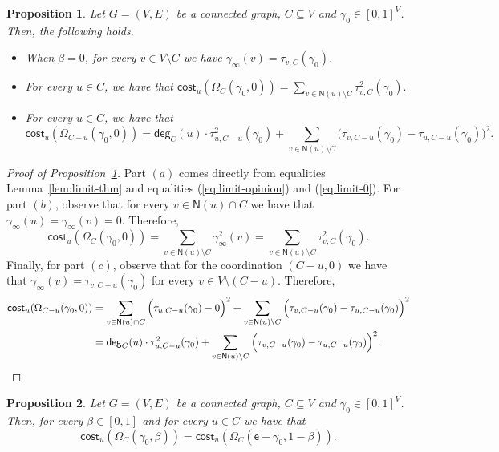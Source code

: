 \documentclass[letterpaper,11pt]{article}
\newcommand{\nsf}{\mathsf{N}}
\newcommand{\cost}{\mathsf{cost}}
\newcommand{\degsf}{\mathsf{deg}}
\newtheorem{proposition}{Proposition}
\begin{document}
\begin{proposition}
\label{prop:properties}
Let $G=(V,E)$ be a connected graph, $C\subseteq V$ and $\gamma_0\in [0,1]^V$.
Then, the following holds.
\begin{itemize}
	\item[$(a)$] When $\beta=0$, for every $v\in V\setminus C$ we have $\gamma_{\infty}(v)=\tau_{v,C}(\gamma_0)$.
	\item[$(b)$]  For every $u\in C$, we have that 
 $\displaystyle \cost_u(\Omega_C(\gamma_0,0))=\sum_{v\in \nsf(u)\setminus C}\tau^2_{v,C}(\gamma_0).$
	\item[$(c)$]  For every $u\in C$, we have that
\begin{equation*}
\cost_u(\Omega_{C-u}(\gamma_0,0))=\degsf_C(u)\cdot \tau^2_{u,C-u}(\gamma_0)+\sum_{v\in \nsf(u)\setminus C}\Big(\tau_{v,C-u}(\gamma_0)-\tau_{u,C-u}(\gamma_0)\Big)^2.
\end{equation*}
\end{itemize}
\end{proposition}

\begin{proof}[Proof of Proposition~\ref{prop:properties}]
Part $(a)$ comes directly from equalities Lemma~\ref{lem:limit-thm} and equalities (\ref{eq:limit-opinion}) and (\ref{eq:limit-0}).
For part $(b)$, observe that for every $v\in \nsf(u)\cap C$ we have that $\gamma_{\infty}(u)=\gamma_{\infty}(v)=0$. 
Therefore,
\begin{equation*}
\cost_u(\Omega_C(\gamma_0,0))=\sum_{v\in \nsf(u)\setminus C}\gamma^2_{\infty}(v)=\sum_{v\in \nsf(u)\setminus C}\tau^2_{v,C}(\gamma_0).
\end{equation*}
Finally, for part $(c)$, observe that for the coordination $(C-u,0)$ we have that $\gamma_{\infty}(v)=\tau_{v,C-u}(\gamma_0)$ for every $v\in V\setminus (C-u)$.
Therefore,  
\begin{align*}
\cost_u(\Omega_{C-u}(\gamma_0,0))&=\sum_{v\in \nsf(u)\cap C}\Big(\tau_{u,C-u}(\gamma_0)-0\Big)^2+\sum_{v\in \nsf(u)\setminus C}\Big(\tau_{v,C-u}(\gamma_0)-\tau_{u,C-u}(\gamma_0)\Big)^2\\
													&=\degsf_C(u)\cdot \tau^2_{u,C-u}(\gamma_0)+\sum_{v\in \nsf(u)\setminus C}\Big(\tau_{v,C-u}(\gamma_0)-\tau_{u,C-u}(\gamma_0)\Big)^2.\qedhere
\end{align*}
\end{proof}

\begin{proposition}
\label{prop:spin}
Let $G=(V,E)$ be a connected graph, $C\subseteq V$ and $\gamma_0\in [0,1]^V$.
Then, for every $\beta \in [0,1]$ and for every $u\in C$ we have that 
\begin{equation*}
\cost_u(\Omega_C(\gamma_0,\beta))=\cost_u(\Omega_C(\mathsf{e}-\gamma_0,1-\beta)).
\end{equation*}
\end{proposition}
\end{document}
